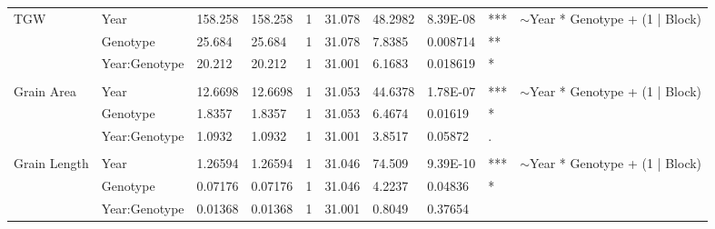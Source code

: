 \documentclass{article}
\begin{document}
\begin{table}[ht]
\begin{adjustbox}
\begin{tabular}{@{}llllllllll@{}}
			\multirow{3}{*}{TGW}                   & Year          & 158.258  & 158.258     & 1         & 31.078   & 48.2982  & 8.39E-08            & *** & \multirow{3}{*}{$\sim$Year * Genotype + (1 | Block)}              \\
			                                       & Genotype      & 25.684   & 25.684      & 1         & 31.078   & 7.8385   & 0.008714            & **  &                                                                   \\
			                                       & Year:Genotype & 20.212   & 20.212      & 1         & 31.001   & 6.1683   & 0.018619            & *   &                                                                   \\
			                                       &               &          &             &           &          &          &                     &     &                                                                   \\
			\multirow{3}{*}{Grain Area}            & Year          & 12.6698  & 12.6698     & 1         & 31.053   & 44.6378  & 1.78E-07            & *** & \multirow{3}{*}{$\sim$Year * Genotype + (1 | Block)}              \\
			                                       & Genotype      & 1.8357   & 1.8357      & 1         & 31.053   & 6.4674   & 0.01619             & *   &                                                                   \\
			                                       & Year:Genotype & 1.0932   & 1.0932      & 1         & 31.001   & 3.8517   & 0.05872             & .   &                                                                   \\
			                                       &               &          &             &           &          &          &                     &     &                                                                   \\
			\multirow{3}{*}{Grain Length}          & Year          & 1.26594  & 1.26594     & 1         & 31.046   & 74.509   & 9.39E-10            & *** & \multirow{3}{*}{$\sim$Year * Genotype + (1 | Block)}              \\
			                                       & Genotype      & 0.07176  & 0.07176     & 1         & 31.046   & 4.2237   & 0.04836             & *   &                                                                   \\
			                                       & Year:Genotype & 0.01368  & 0.01368     & 1         & 31.001   & 0.8049   & 0.37654             &     &                                                                   \\

\end{tabular}
\end{adjustbox}
\end{table}
\end{document}
